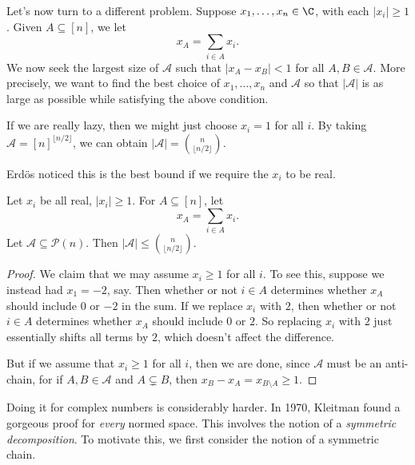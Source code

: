 \documentclass[a4paper]{article}
\begin{document}

Let's now turn to a different problem. Suppose $x_1, \ldots, x_n \in \C$, with each $|x_i| \geq 1$. Given $A \subseteq [n]$, we let
\[
  x_A = \sum_{i \in A} x_i.
\]
We now seek the largest size of $\mathcal{A}$ such that $|x_A - x_B| < 1$ for all $A, B \in \mathcal{A}$. More precisely, we want to find the best choice of $x_1, \ldots, x_n$ and $\mathcal{A}$ so that $|\mathcal{A}|$ is as large as possible while satisfying the above condition.

If we are really lazy, then we might just choose $x_i = 1$ for all $i$. By taking $\mathcal{A} = [n]^{\lfloor n/2\rfloor}$, we can obtain $|\mathcal{A}| = \binom{n}{\lfloor n/2\rfloor}$.

Erd\"os noticed this is the best bound if we require the $x_i$ to be real.

\begin{thm}[Erd\"os, 1945]
  Let $x_i$ be all real, $|x_i| \geq 1$. For $A \subseteq [n]$, let
  \[
    x_A = \sum_{i \in A} x_i.
  \]
  Let $\mathcal{A} \subseteq \mathcal{P}(n)$. Then $|\mathcal{A}| \leq \binom{n}{\lfloor n/2\rfloor}$.
\end{thm}

\begin{proof}
  We claim that we may assume $x_i \geq 1$ for all $i$. To see this, suppose we instead had $x_1 = -2$, say. Then whether or not $i \in A$ determines whether $x_A$ should include $0$ or $-2$ in the sum. If we replace $x_i$ with $2$, then whether or not $i \in A$ determines whether $x_A$ should include $0$ or $2$. So replacing $x_i$ with $2$ just essentially shifts all terms by $2$, which doesn't affect the difference.

  But if we assume that $x_i \geq 1$ for all $i$, then we are done, since $\mathcal{A}$ must be an anti-chain, for if $A, B \in \mathcal{A}$ and $A \subsetneq B$, then $x_B - x_A = x_{B\setminus A} \geq 1$.
\end{proof}

Doing it for complex numbers is considerably harder. In 1970, Kleitman found a gorgeous proof for \emph{every} normed space. This involves the notion of a \emph{symmetric decomposition}. To motivate this, we first consider the notion of a symmetric chain.
\end{document}
